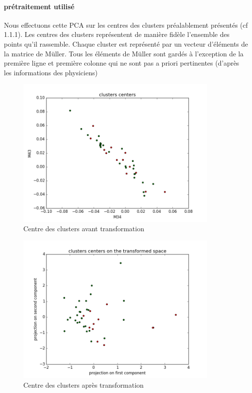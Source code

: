 \documentclass[a4paper,10pt]{report}
\begin{document}
\paragraph{prétraitement utilisé}
Nous effectuons cette PCA sur les centres des clusters préalablement présentés (cf 1.1.1). Les centres des clusters représentent de manière fidèle l'ensemble des points qu'il rassemble. Chaque cluster est représenté par un vecteur d'éléments de la matrice de Müller. Tous les éléments de Müller sont gardés à l’exception de la première ligne et première colonne qui ne sont pas a priori pertinentes (d'après les informations des physiciens)
\begin{figure}
  \caption{Centre des clusters avant transformation}
  \centering
  \includegraphics[width=10cm]{PCA_0.png}
\end{figure}
\begin{figure}
  \caption{Centre des clusters après transformation}
  \centering
  \includegraphics[width=10cm]{PCA_1.png}
\end{figure}
\end{document}
